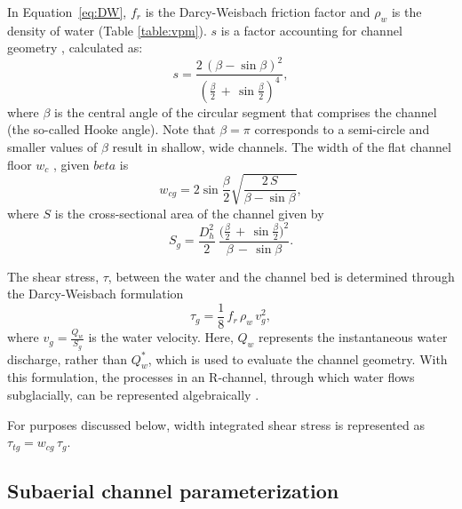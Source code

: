 \documentclass[11pt]{article}
\begin{document}
\begin{spacing}{1}
  In Equation~\ref{eq:DW}, $f_r$ is the Darcy-Weisbach friction factor and $\rho_w$ is the density of water (Table \ref{table:vpm}). $s$ is a factor accounting for channel geometry \citep{hooke1990}, calculated as:
  \begin{equation}
    \label{eq:Hf}
    s = \frac{2\,(\beta -\sin \beta)^2}{(\frac{\beta}{2}\,+\,\sin \frac{\beta}{2})^4},
  \end{equation}
  where $\beta$ is the central angle of the circular segment that comprises the channel (the so-called Hooke angle). Note that $\beta =\pi$ corresponds to a semi-circle and
  smaller values of $\beta$ result in shallow, wide channels. 
  The width of the flat channel floor $w_c$ , given $beta$ is   \begin{equation}
    \label{eq:dh2wc}
    w_{cg} = 2  \sin \frac{\beta}{2} \sqrt{\frac{2\, S}{\beta -\sin \beta}},
  \end{equation}
  where $S$ is the cross-sectional area of the channel given by
  \begin{equation}
    \label{eq:dh2S}
    S_g =  \frac{D_h^2}{2}~ \frac{\Big(\frac{\beta}{2} \,+ \, \sin \frac{\beta}{2}\Big)^2  }{\beta\,-\,\sin \beta}.
  \end{equation}
  
  The shear stress, $\tau$, between the water and the channel bed is determined through the Darcy-Weisbach formulation
  \begin{equation}
    \label{eq:tau}
    \tau_g=\frac{1}{8}\,f_r\,\rho_w\,v_g^2,
  \end{equation}
  where $v_g = \frac{Q_w}{S_g}$ is the water velocity.
  Here, $Q_w$ represents the instantaneous water discharge, rather than $Q_w^*$, which is used to evaluate the channel geometry.
  With this formulation, the processes in an R-channel, through which water flows subglacially, can be represented algebraically \citep{rothlisberger1972,delaney2019}.
  
  For purposes discussed below, width integrated shear stress is represented as $\tau_{tg}=w_{cg}\,\tau_g $.
  
  \subsection{Subaerial channel  parameterization}
  \label{sect:fluv}
  

\end{spacing}
\end{document}
